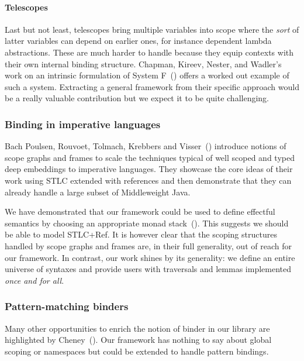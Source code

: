 \paragraph{Telescopes}
Last but not least, telescopes bring multiple variables into scope where
the \emph{sort} of latter variables can depend on earlier ones, for instance
dependent lambda abstractions.
%
These are much harder to handle because they equip contexts with their
own internal binding structure. Chapman, Kireev, Nester, and Wadler's work on
an intrinsic formulation of System F~(\citeyear{DBLP:conf/mpc/ChapmanKNW19})
offers a worked out example of such a system. Extracting a general framework
from their specific approach would be a really valuable contribution but we
expect it to be quite challenging.

\subsubsection{Binding in imperative languages}

Bach Poulsen, Rouvoet, Tolmach, Krebbers and Visser~(\citeyear{BachPoulsen})
introduce notions of scope graphs and frames to scale the techniques typical
of well scoped and typed deep embeddings to imperative languages.
They showcase the core ideas of their work using STLC extended with references
and then demonstrate that they can already handle a large subset of Middleweight
Java.

We have demonstrated that our framework could be used to define effectful
semantics by choosing an appropriate monad
stack~(\cite{DBLP:journals/iandc/Moggi91}).
This suggests we should be able to model STLC+Ref. It is however clear that
the scoping structures handled by scope graphs and frames are, in their full
generality, out of reach for our framework. In contrast, our work shines by
its generality: we define an entire universe of syntaxes and provide users
with traversals and lemmas implemented \emph{once and for all}.

\subsubsection{Pattern-matching binders}

Many other opportunities to enrich the notion of binder in our library are
highlighted by Cheney~(\citeyear{DBLP:conf/icfp/Cheney05a}).
%
Our framework has nothing to say about global scoping or namespaces but
could be extended to handle pattern bindings.

